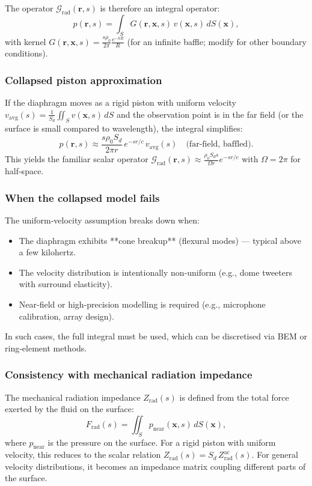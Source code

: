 The operator \(\mathcal{G}_{\mathrm{rad}}(\mathbf{r},s)\) is therefore an integral operator:
\[
p(\mathbf{r},s) = \int_S G(\mathbf{r},\mathbf{x},s)\, v(\mathbf{x},s) \, dS(\mathbf{x}),
\]
with kernel \(G(\mathbf{r},\mathbf{x},s) = \frac{s\rho_0}{2\pi} \frac{e^{-kR}}{R}\) (for an infinite baffle; modify for other boundary conditions).

\subsubsection{Collapsed piston approximation}

If the diaphragm moves as a rigid piston with uniform velocity \(v_{\mathrm{avg}}(s) = \frac{1}{S_d}\iint_S v(\mathbf{x},s)\,dS\) and the observation point is in the far field (or the surface is small compared to wavelength), the integral simplifies:
\[
p(\mathbf{r},s) \approx \frac{s\rho_0 S_d}{2\pi r}\, e^{-sr/c}\, v_{\mathrm{avg}}(s) \quad \text{(far-field, baffled)}.
\]
This yields the familiar scalar operator \(\mathcal{G}_{\mathrm{rad}}(\mathbf{r},s) \approx \frac{\rho_0 S_d s}{\Omega r} e^{-sr/c}\) with \(\Omega = 2\pi\) for half‑space.

\subsubsection{When the collapsed model fails}

The uniform‑velocity assumption breaks down when:
\begin{itemize}
  \item The diaphragm exhibits **cone breakup** (flexural modes) — typical above a few kilohertz.
  \item The velocity distribution is intentionally non‑uniform (e.g., dome tweeters with surround elasticity).
  \item Near‑field or high‑precision modelling is required (e.g., microphone calibration, array design).
\end{itemize}
In such cases, the full integral must be used, which can be discretised via BEM or ring‑element methods.

\subsubsection{Consistency with mechanical radiation impedance}

The mechanical radiation impedance \(Z_{\mathrm{rad}}(s)\) is defined from the total force exerted by the fluid on the surface:
\[
F_{\mathrm{rad}}(s) = \iint_S p_{\mathrm{near}}(\mathbf{x},s) \, dS(\mathbf{x}),
\]
where \(p_{\mathrm{near}}\) is the pressure on the surface. For a rigid piston with uniform velocity, this reduces to the scalar relation \(Z_{\mathrm{rad}}(s) = S_d \, Z_{\mathrm{rad}}^{\mathrm{ac}}(s)\). For general velocity distributions, it becomes an impedance matrix coupling different parts of the surface.

